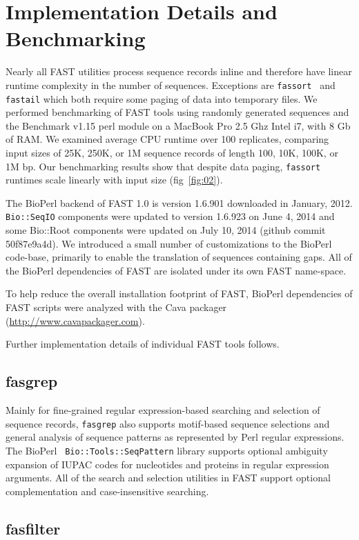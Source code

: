\documentclass{frontiersSCNS} %
\begin{document}
\section{Implementation Details and Benchmarking}

Nearly all FAST utilities process sequence records inline and
therefore have linear runtime complexity in the number of
sequences. Exceptions are {\tt fassort } and {\tt fastail} which both
require some paging of data into temporary files. We performed
benchmarking of FAST tools using randomly generated sequences and the
Benchmark v1.15 perl module on a MacBook Pro 2.5 Ghz Intel i7, with 8
Gb of RAM. We examined average CPU runtime over 100 replicates,
comparing input sizes of 25K, 250K, or 1M sequence records of length
100, 10K, 100K, or 1M bp. Our benchmarking results show that despite
data paging, {\tt fassort} runtimes scale linearly with input size
(fig~\ref{fig:02}).

The BioPerl backend of FAST 1.0 is version 1.6.901 downloaded in
January, 2012. {\tt Bio::SeqIO} components were updated to version 1.6.923
on June 4, 2014 and some Bio::Root components were updated on July 10,
2014 (github commit 50f87e9a4d).  We introduced a small number of
customizations to the BioPerl code-base, primarily to
enable the translation of sequences containing gaps. All of the
BioPerl dependencies of FAST are isolated under its own FAST
name-space.

To help reduce the overall installation footprint of FAST, BioPerl
dependencies of FAST scripts were analyzed with the Cava packager
(\url{http://www.cavapackager.com}).

Further implementation details of individual FAST tools follows.

\subsection{fasgrep}

Mainly for fine-grained regular expression-based searching and
selection of sequence records, {\tt fasgrep} also supports motif-based
sequence selections and general analysis of sequence patterns as
represented by Perl regular expressions. The BioPerl {\tt
  Bio::Tools::SeqPattern} library supports optional ambiguity
expansion of IUPAC codes for nucleotides and proteins in regular
expression arguments. All of the search and selection utilities in
FAST support optional complementation and case-insensitive searching.

\subsection{fasfilter}
 
\end{document}
